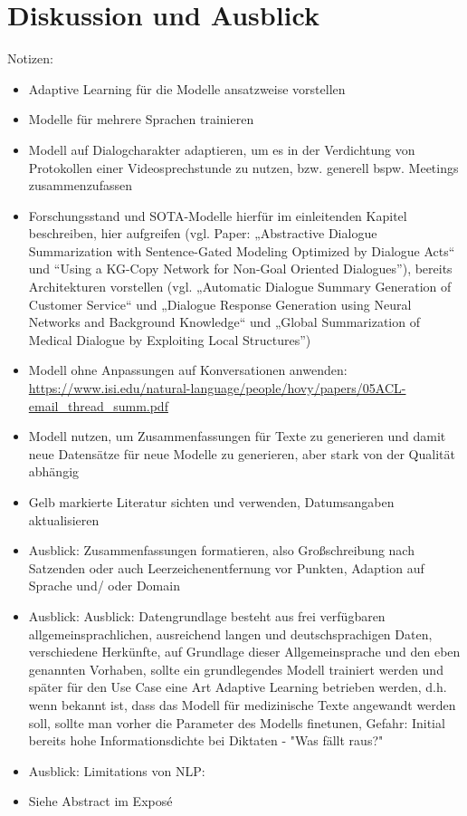 \chapter{Diskussion und Ausblick}
\thispagestyle{fancy}
\label{chap:Diskussion und Ausblick}

Notizen:
\begin{itemize}
	\item Adaptive Learning für die Modelle ansatzweise vorstellen
	\item Modelle für mehrere Sprachen trainieren
	\item Modell auf Dialogcharakter adaptieren, um es in der Verdichtung von Protokollen einer Videosprechstunde zu nutzen, bzw. generell bspw. Meetings zusammenzufassen
	\item Forschungsstand und SOTA-Modelle hierfür im einleitenden Kapitel beschreiben, hier aufgreifen (vgl. Paper: „Abstractive Dialogue Summarization with Sentence-Gated Modeling Optimized by Dialogue Acts“ und “Using a KG-Copy Network for Non-Goal Oriented Dialogues”), bereits Architekturen vorstellen (vgl. „Automatic Dialogue Summary Generation of Customer Service“ und „Dialogue Response Generation using Neural Networks and Background Knowledge“ und „Global Summarization of Medical Dialogue by Exploiting Local Structures”)
	\item Modell ohne Anpassungen auf Konversationen anwenden: \url{https://www.isi.edu/natural-language/people/hovy/papers/05ACL-email_thread_summ.pdf}
	\item Modell nutzen, um Zusammenfassungen für Texte zu generieren und damit neue Datensätze für neue Modelle zu generieren, aber stark von der Qualität abhängig
	\item Gelb markierte Literatur sichten und verwenden, Datumsangaben aktualisieren
	\item Ausblick: Zusammenfassungen formatieren, also Großschreibung nach Satzenden oder auch Leerzeichenentfernung vor Punkten, Adaption auf Sprache und/ oder Domain
	\item Ausblick: Ausblick: Datengrundlage besteht aus frei verfügbaren allgemeinsprachlichen, ausreichend langen und deutschsprachigen Daten, verschiedene Herkünfte, auf Grundlage dieser Allgemeinsprache und den eben genannten Vorhaben, sollte ein grundlegendes Modell trainiert werden und später für den Use Case eine Art Adaptive Learning betrieben werden, d.h. wenn bekannt ist, dass das Modell für medizinische Texte angewandt werden soll, sollte man vorher die Parameter des Modells finetunen, Gefahr: Initial bereits hohe Informationsdichte bei Diktaten - "Was fällt raus?"
	\item Ausblick: Limitations von NLP: \cite[S.~30-31]{BIR09}
	\item Siehe Abstract im Exposé
\end{itemize}
